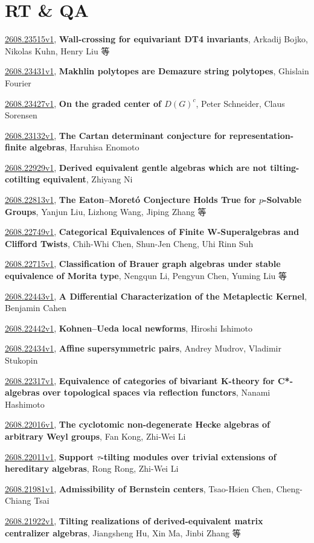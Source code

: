 \documentclass[9pt, a4paper]{article}
\theoremstyle{plain}
\theoremstyle{definition}
\theoremstyle{remark}
\newcommand{\arxiv}[3]{\href{https://arxiv.org/abs/#1}{#1}, \textbf{\textcolor{arxivblue}{#2}}, #3}
\begin{document}

\section{RT \& QA}
\arxiv{2608.23515v1}{Wall-crossing for equivariant DT4 invariants}{Arkadij Bojko, Nikolas Kuhn, Henry Liu 等}

\arxiv{2608.23431v1}{Makhlin polytopes are Demazure string polytopes}{Ghislain Fourier}

\arxiv{2608.23427v1}{On the graded center of $D(G)^c$}{Peter Schneider, Claus Sorensen}

\arxiv{2608.23132v1}{The Cartan determinant conjecture for representation-finite algebras}{Haruhisa Enomoto}

\arxiv{2608.22929v1}{Derived equivalent gentle algebras which are not tilting-cotilting equivalent}{Zhiyang Ni}

\arxiv{2608.22813v1}{The Eaton--Moretó Conjecture Holds True for \(p\)-Solvable Groups}{Yanjun Liu, Lizhong Wang, Jiping Zhang 等}

\arxiv{2608.22749v1}{Categorical Equivalences of Finite W-Superalgebras and Clifford Twists}{Chih-Whi Chen, Shun-Jen Cheng, Uhi Rinn Suh}

\arxiv{2608.22715v1}{Classification of Brauer graph algebras under stable equivalence of Morita type}{Nengqun Li, Pengyun Chen, Yuming Liu 等}

\arxiv{2608.22443v1}{A Differential Characterization of the Metaplectic Kernel}{Benjamin Cahen}

\arxiv{2608.22442v1}{Kohnen--Ueda local newforms}{Hiroshi Ishimoto}

\arxiv{2608.22434v1}{Affine supersymmetric pairs}{Andrey Mudrov, Vladimir Stukopin}

\arxiv{2608.22317v1}{Equivalence of categories of bivariant K-theory for C*-algebras over topological spaces via reflection functors}{Nanami Hashimoto}

\arxiv{2608.22016v1}{The cyclotomic non-degenerate Hecke algebras of arbitrary Weyl groups}{Fan Kong, Zhi-Wei Li}

\arxiv{2608.22011v1}{Support $τ$-tilting modules over trivial extensions of hereditary algebras}{Rong Rong, Zhi-Wei Li}

\arxiv{2608.21981v1}{Admissibility of Bernstein centers}{Tsao-Hsien Chen, Cheng-Chiang Tsai}

\arxiv{2608.21922v1}{Tilting realizations of derived-equivalent matrix centralizer algebras}{Jiangsheng Hu, Xin Ma, Jinbi Zhang 等}
\end{document}
